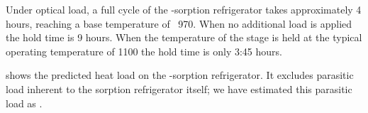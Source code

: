 Under optical load, a full cycle of the -sorption refrigerator takes approximately 4 hours, reaching a base temperature of ~\SI{970}{\mK}.
When no additional load is applied the hold time is 9 hours.
When the temperature of the stage is held at the typical operating temperature of \SI{1100}{\mK} the hold time is only 3:45 hours.

 shows the predicted heat load on the -sorption refrigerator.
It excludes parasitic load inherent to the sorption refrigerator itself; we have estimated this parasitic load as .



